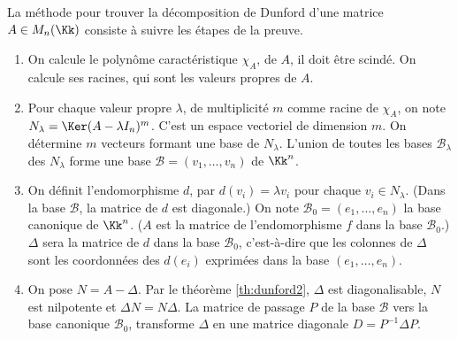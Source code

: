 \documentclass[12pt, class=report,crop=false]{standalone}
\begin{document}
La méthode pour trouver la décomposition de Dunford d'une matrice $A \in M_n(\Kk)$ consiste à suivre les étapes de la preuve.
\begin{enumerate}

  \item On calcule le polynôme caractéristique $\chi_A$, de $A$, il doit être scindé. On calcule ses racines, qui sont les valeurs propres de $A$.
  
  \item  Pour chaque valeur propre $\lambda$, de multiplicité $m$ comme racine de $\chi_A$,
  on note $N_\lambda = \Ker (A-\lambda I_n)^m$. C'est un espace vectoriel de dimension $m$. On détermine
  $m$ vecteurs formant une base de $N_\lambda$.
L'union de toutes les bases $\mathcal{B}_\lambda$ des $N_\lambda$ forme une base $\mathcal{B}
  = (v_1,\ldots,v_n)$ de $\Kk^n$.
   
  \item On définit l'endomorphisme $d$, par $d(v_i) = \lambda v_i$ pour chaque $v_i \in N_\lambda$.  
  (Dans la base $\mathcal{B}$, la matrice de $d$ est diagonale.)
  On note $\mathcal{B}_0 = (e_1,\ldots,e_n)$ la base canonique de $\Kk^n$. ($A$
  est la matrice de l'endomorphisme $f$ dans la base $\mathcal{B}_0$.) 
  $\Delta$ sera la matrice de $d$ dans la base $\mathcal{B}_0$,
  c'est-à-dire que les colonnes de $\Delta$ sont les coordonnées des $d(e_i)$ exprimées dans la base $(e_1,\ldots,e_n)$. 
  
  \item On pose $N = A - \Delta$. Par le théorème \ref{th:dunford2}, $\Delta$ est diagonalisable, $N$ est nilpotente et $\Delta  N = N \Delta$. La matrice de passage $P$ de la base $\mathcal{B}$ vers la base canonique $\mathcal{B}_0$, transforme $\Delta$ en une matrice diagonale $D = P^{-1}\Delta P$. 
\end{enumerate}
\end{document}
